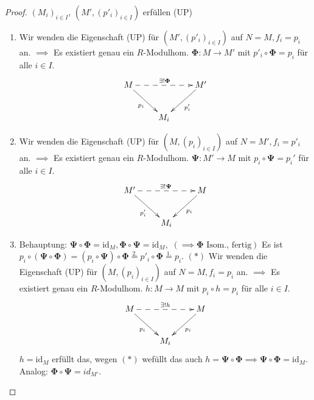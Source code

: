 \documentclass[a4paper, titlepage]{article}
\theoremstyle{definition}
\newcommand{\id}{\mathrm{id}}
\begin{document}
        \begin{proof}
            $(M_i)_{i\in I}$, $(M',(p'_i)_{i\in I})$ erfüllen (UP)
            \begin{enumerate}[1.]
                \item Wir wenden die Eigenschaft (UP) für $(M',(p'_i)_{i\in I})$ auf $N=M,f_i=p_i$ an.\newline
                $\implies $ Es existiert genau ein $R$-Modulhom. $\boldsymbol{\Phi}:M\longrightarrow M'$ mit $p'_i\circ\boldsymbol{\Phi}=p_i$ für alle $i\in I.$
                \[ 
                \begin{xy}
                    \xymatrix{
                    M \ar@{-->}[rr]^{\exists!\boldsymbol{\Phi}} \ar[dr]_{p_i} &&M'\ar[dl]^{p'_i}\\
                    &M_i&
                    }
                \end{xy}
                \]
                \item Wir wenden die Eigenschaft (UP) für $(M,(p_i)_{i\in I})$ auf $N=M',f_i=p'_i$ an.\newline
                $\implies $ Es existiert genau ein $R$-Modulhom. $\boldsymbol{\Psi}:M'\longrightarrow M$ mit $p_i\circ\boldsymbol{\Psi}=p_i'$ für alle $i\in I.$
                \[ 
                \begin{xy}
                    \xymatrix{
                    M' \ar@{-->}[rr]^{\exists!\boldsymbol{\Psi}} \ar[dr]_{p'_i} &&M\ar[dl]^{p_i}\\
                    &M_i&
                    }
                \end{xy}
                \]
                \item Behauptung: $\boldsymbol{\Psi}\circ \boldsymbol{\Phi}=\id_M,\boldsymbol{\Phi}\circ\boldsymbol{\Psi}=\id_M,$ $(\implies \boldsymbol{\Phi}\text{ Isom., fertig})$\newline
                Es ist $p_i\circ (\boldsymbol{\Psi}\circ\boldsymbol{\Phi})=(p_i\circ\boldsymbol{\Psi})\circ\boldsymbol{\Phi}\overset{2.}{=}p'_i\circ\boldsymbol{\Phi}\overset{1.}{=}p_i.$ $ (\ast)$ \newline
                Wir wenden die Eigenschaft (UP) für $(M,(p_i)_{i\in I})$ auf $N=M,f_i=p_i$ an.\newline
                $\implies $ Es existiert genau ein $R$-Modulhom. $h:M\longrightarrow M$ mit $p_i\circ h=p_i$ für alle $i\in I.$
                \[ 
                \begin{xy}
                    \xymatrix{
                    M \ar@{-->}[rr]^{\exists!h} \ar[dr]_{p_i} &&M\ar[dl]^{p_i}\\
                    &M_i&
                    }
                \end{xy}
                \]
                $h=\id_M$ erfüllt das, wegen $(\ast)$ wefüllt das auch $h=\boldsymbol{\Psi}\circ\boldsymbol{\Phi}\implies \boldsymbol{\Psi}\circ\boldsymbol{\Phi}=\id_M.$ Analog: $\boldsymbol{\Phi}\circ\boldsymbol{\Psi}=id_{M'}.$
            \end{enumerate}
        \end{proof}
\end{document}
